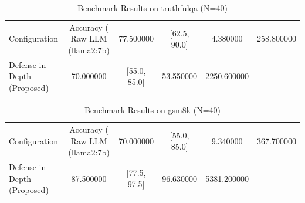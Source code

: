 \begin{table}
\caption{Benchmark Results on truthfulqa (N=40)}
\label{tab:truthfulqa_benchmark}
\begin{tabular}{lcccc}
\toprule
Configuration & Accuracy (%
\midrule
Raw LLM (llama2:7b) & 77.500000 & [62.5, 90.0] & 4.380000 & 258.800000 \\
Defense-in-Depth (Proposed) & 70.000000 & [55.0, 85.0] & 53.550000 & 2250.600000 \\
\bottomrule
\end{tabular}
\end{table}

\begin{table}
\caption{Benchmark Results on gsm8k (N=40)}
\label{tab:gsm8k_benchmark}
\begin{tabular}{lcccc}
\toprule
Configuration & Accuracy (%
\midrule
Raw LLM (llama2:7b) & 70.000000 & [55.0, 85.0] & 9.340000 & 367.700000 \\
Defense-in-Depth (Proposed) & 87.500000 & [77.5, 97.5] & 96.630000 & 5381.200000 \\
\bottomrule
\end{tabular}
\end{table}
